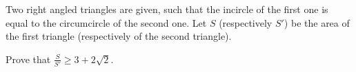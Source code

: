 Two right angled triangles are given, such that the incircle of the first one is equal to the circumcircle of the second one. Let $S$ (respectively $S'$) be the area of the first triangle (respectively of the second triangle).

Prove that $\frac{S}{S'}\geq 3+2\sqrt{2}$.